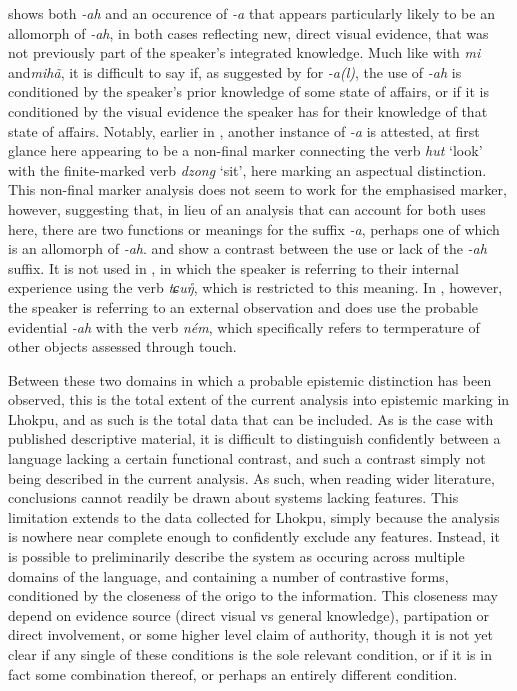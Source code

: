  shows both \textit{-ah} and an occurence of \textit{-a} that appears particularly likely to be an allomorph of \textit{-ah}, in both cases reflecting new, direct visual evidence, that was not previously part of the speaker's integrated knowledge. Much like with \textit{mi} and\textit{mihã}, it is difficult to say if, as suggested by  for \textit{-a(l)}, the use of \textit{-ah} is conditioned by the speaker's prior knowledge of some state of affairs, or if it is conditioned by the visual evidence the speaker has for their knowledge of that state of affairs. Notably, earlier in , another instance of \textit{-a} is attested, at first glance here appearing to be a non-final marker connecting the verb \textit{hut} `look' with the finite-marked verb \textit{dzong} `sit', here marking an aspectual distinction. This non-final marker analysis does not seem to work for the emphasised marker, however, suggesting that, in lieu of an analysis that can account for both uses here, there are two functions or meanings for the suffix \textit{-a}, perhaps one of which is an allomorph of \textit{-ah}.  and  show a contrast between the use or lack of the \textit{-ah} suffix. It is not used in , in which the speaker is referring to their internal experience using the verb \textit{tɕuŋ̊}, which is restricted to this meaning. In , however, the speaker is referring to an external observation and does use the probable evidential \textit{-ah} with the verb \textit{ném}, which specifically refers to termperature of other objects assessed through touch.

Between these two domains in which a probable epistemic distinction has been observed, this is the total extent of the current analysis into epistemic marking in Lhokpu, and as such is the total data that can be included. As is the case with published descriptive material, it is difficult to distinguish confidently between a language lacking a certain functional contrast, and such a contrast simply not being described in the current analysis. As such, when reading wider literature, conclusions cannot readily be drawn about systems lacking features. This limitation extends to the data collected for Lhokpu, simply because the analysis is nowhere near complete enough to confidently exclude any features. Instead, it is possible to preliminarily describe the system as occuring across multiple domains of the language, and containing a number of contrastive forms, conditioned by the closeness of the origo to the information. This closeness may depend on evidence source (direct visual vs general knowledge), partipation or direct involvement, or some higher level claim of authority, though it is not yet clear if any single of these conditions is the sole relevant condition, or if it is in fact some combination thereof, or perhaps an entirely different condition.


